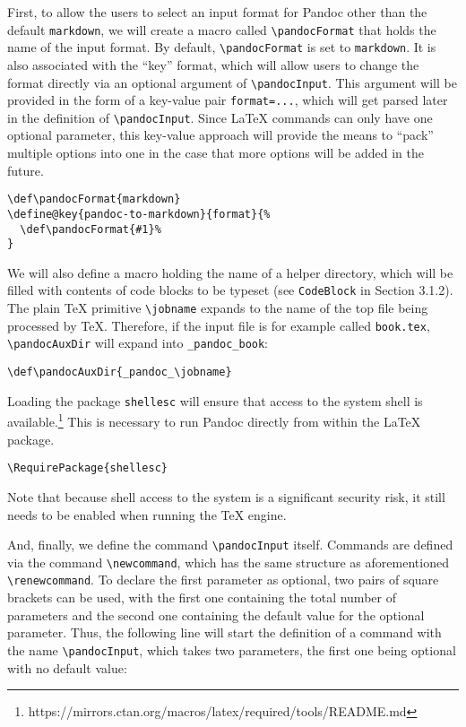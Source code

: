 \documentclass[
  digital,     %
  oneside,     %
  nosansbold,  %
  nocolorbold, %
  lof,         %
  nolot,       %
]{fithesis4}
\newcommand\macro[1]{\texttt{\textbackslash{}{#1}}}
\begin{document}
First, to allow the users to select an input format for Pandoc other than the default \texttt{markdown}, we will create a macro called \macro{pandocFormat} that holds the name of the input format. By default, \macro{pandocFormat} is set to \texttt{markdown}. It is also associated with the ``key'' format, which will allow users to change the format directly via an optional argument of \macro{pandocInput}. This argument will be provided in the form of a key-value pair \texttt{format=...}, which will get parsed later in the definition of \macro{pandocInput}. Since \LaTeX{} commands can only have one optional parameter, this key-value approach will provide the means to ``pack'' multiple options into one in the case that more options will be added in the future.

\noindent
\lstset{language=[LaTeX]TeX}
\begin{lstlisting}
\def\pandocFormat{markdown}
\define@key{pandoc-to-markdown}{format}{%
  \def\pandocFormat{#1}%
}
\end{lstlisting}

\noindent
We will also define a macro holding the name of a helper directory, which will be filled with contents of code blocks to be typeset (see \texttt{CodeBlock} in Section 3.1.2). The plain \TeX{} primitive \macro{jobname} expands to the name of the top file being processed by \TeX{}. Therefore, if the input file is for example called \texttt{book.tex}, \macro{pandocAuxDir} will expand into \texttt{\_pandoc\_book}:

\noindent
\lstset{language=[LaTeX]TeX}
\begin{lstlisting}
\def\pandocAuxDir{_pandoc_\jobname}
\end{lstlisting}

\noindent
Loading the package \texttt{shellesc} will ensure that access to the system shell is available.\footnote{https://mirrors.ctan.org/macros/latex/required/tools/README.md} This is necessary to run Pandoc directly from within the \LaTeX{} package.

\noindent
\lstset{language=[LaTeX]TeX}
\begin{lstlisting}
\RequirePackage{shellesc}
\end{lstlisting}

\noindent
Note that because shell access to the system is a significant security risk, it still needs to be enabled when running the \TeX{} engine.

And, finally, we define the command \macro{pandocInput} itself. Commands are defined via the command \macro{newcommand}, which has the same structure as aforementioned \macro{renewcommand}. To declare the first parameter as optional, two pairs of square brackets can be used, with the first one containing the total number of parameters and the second one containing the default value for the optional parameter. Thus, the following line will start the definition of a command with the name \macro{pandocInput}, which takes two parameters, the first one being optional with no default value:
\end{document}
